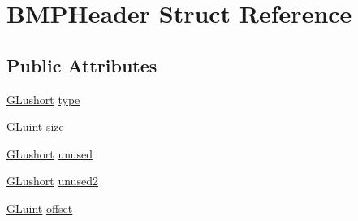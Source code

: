 \hypertarget{struct_b_m_p_header}{\section{B\-M\-P\-Header Struct Reference}
\label{struct_b_m_p_header}
}
\subsection*{Public Attributes}
\begin{DoxyCompactItemize}
\item 
\hyperlink{_g_l_e_w_2glew_8h_ac995a558f6571eb5f98b7a6d2b2a4468}{G\-Lushort} \hyperlink{struct_b_m_p_header_a4e9305ba624f3049c44583b5e0e800ff}{type}
\item 
\hyperlink{_g_l_e_w_2glew_8h_a68c4714e43d8e827d80759f9cb864f3c}{G\-Luint} \hyperlink{struct_b_m_p_header_a2222008e2596776c3084a73633f126ce}{size}
\item 
\hyperlink{_g_l_e_w_2glew_8h_ac995a558f6571eb5f98b7a6d2b2a4468}{G\-Lushort} \hyperlink{struct_b_m_p_header_afabe8ec4388e32908df68bc2d16be08f}{unused}
\item 
\hyperlink{_g_l_e_w_2glew_8h_ac995a558f6571eb5f98b7a6d2b2a4468}{G\-Lushort} \hyperlink{struct_b_m_p_header_af9f40b8b630a86ab783f1ae423919626}{unused2}
\item 
\hyperlink{_g_l_e_w_2glew_8h_a68c4714e43d8e827d80759f9cb864f3c}{G\-Luint} \hyperlink{struct_b_m_p_header_a6adff8db296330066687d87a0d8ef588}{offset}
\end{DoxyCompactItemize}


